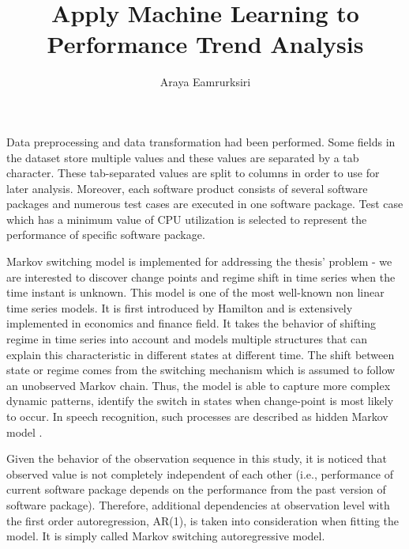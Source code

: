 \documentclass[]{article}
\title{Apply Machine Learning to Performance Trend Analysis}
\author{Araya Eamrurksiri}
\begin{document}
\date{}
\maketitle

Data preprocessing and data transformation had been performed. Some fields in the dataset store multiple values and these values are separated by a tab character. These tab-separated values are split to columns in order to use for later analysis. Moreover, each software product consists of several software packages and numerous test cases are executed in one software package. Test case which has a minimum value of CPU utilization is selected to represent the performance of specific software package.

Markov switching model is implemented for addressing the thesis' problem - we are interested to discover change points and regime shift in time series when the time instant is unknown. This model is one of the most well-known non linear time series models. It is first introduced by Hamilton \cite{hamilton1989new} and is extensively implemented in economics and finance field. It takes the behavior of shifting regime in time series into account and models multiple structures that can explain this characteristic in different states at different time. The shift between state or regime comes from the switching mechanism which is assumed to follow an unobserved Markov chain. Thus, the model is able to capture more complex dynamic patterns, identify the switch in states when change-point is most likely to occur. In speech recognition, such processes are described as hidden Markov model \cite{rabiner1989tutorial}. 

Given the behavior of the observation sequence in this study, it is noticed that observed value is not completely independent of each other (i.e., performance of current software package depends on the performance from the past version of software package). Therefore, additional dependencies at observation level with the first order autoregression, AR(1), is taken into consideration when fitting the model. It is simply called Markov switching autoregressive model.
\end{document}

